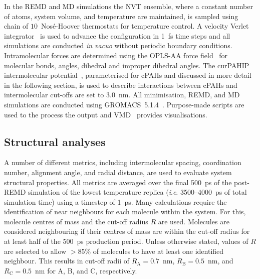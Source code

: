 In the REMD and MD simulations the NVT ensemble, where a constant number of atoms, system volume, and temperature are maintained, is sampled using chain of $10$~Nos\'{e}-Hoover thermostats for temperature control. A velocity Verlet integrator~\cite{Verlet_1967} is used to advance the configuration in 1~fs time steps and all simulations are conducted \textit{in vacuo} without periodic boundary conditions.  Intramolecular forces are determined using the OPLS-AA force field~\cite{Kaminski2001opls} for molecular bonds, angles, dihedral and improper dihedral angles. The curPAHIP intermolecular potential~\cite{bowal2019ion}, parameterised for cPAHs and discussed in more detail in the following section, is used to describe interactions between cPAHs and intermolecular cut-offs are set to $3.0$~nm. All minimisation, REMD, and MD simulations are conducted using GROMACS~5.1.4~\cite{Abraham2015}. Purpose-made scripts are used to the process the output and VMD~\cite{Humphrey1996} provides visualisations.


\subsection{Structural analyses}
A number of different metrics, including intermolecular spacing, coordination number, alignment angle, and radial distance, are used to evaluate system structural properties. All metrics are averaged over the final 500~ps of the post-REMD simulation of the lowest temperature replica (\textit{i}.\textit{e}. 3500--4000~ps of total simulation time) using a timestep of 1~ps. 
Many calculations require the identification of near neighbours for each molecule within the system. For this, molecule centres of mass and the cut-off radius $R$ are used. Molecules are considered neighbouring if their centres of mass are within the cut-off radius for at least half of the 500~ps production period. Unless otherwise stated, values of $R$ are selected to allow $>85\%$ of molecules to have at least one identified neighbour. This results in cut-off radii of $R_{\text{A}} = 0.7$~nm, $R_{\text{B}} = 0.5$~nm, and $R_{\text{C}} = 0.5$~nm for A, B, and C, respectively. 

